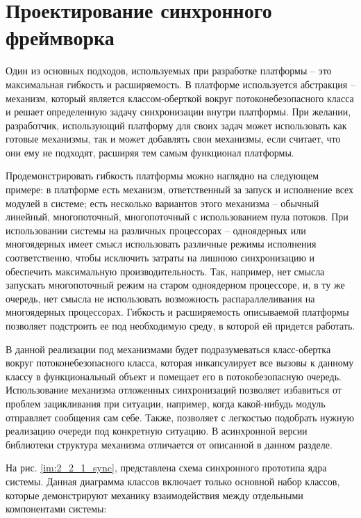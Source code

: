 \section{Проектирование синхронного фреймворка}

Один из основных подходов, используемых при разработке платформы – это 
максимальная гибкость и расширяемость. В платформе используется абстракция – 
механизм, который является классом-оберткой вокруг потоконебезопасного класса и 
решает определенную задачу синхронизации внутри платформы. При желании, 
разработчик, использующий платформу для своих задач  может использовать как 
готовые механизмы, так и может добавлять свои механизмы, если считает, что они 
ему не подходят, расширяя тем самым функционал платформы.

Продемонстрировать гибкость платформы можно наглядно на следующем примере: в 
платформе есть механизм, ответственный за запуск и исполнение всех модулей в 
системе; есть несколько вариантов этого механизма – обычный линейный, 
многопоточный, многопоточный с использованием пула потоков. При использовании 
системы на различных процессорах – одноядерных или многоядерных имеет смысл 
использовать различные режимы исполнения соответственно, чтобы исключить 
затраты на лишнюю синхронизацию и обеспечить максимальную производительность. 
Так, например, нет смысла запускать многопоточный режим на старом одноядерном 
процессоре, и, в ту же очередь, нет смысла не использовать возможность 
распараллеливания на многоядерных процессорах. Гибкость и расширяемость 
описываемой платформы позволяет подстроить ее под необходимую среду, в которой 
ей придется работать.

В данной реализации под механизмами будет подразумеваться класс-обертка вокруг потоконебезопасного класса, которая инкапсулирует все вызовы к данному классу в функциональный объект и помещает его в потокобезопасную очередь. Использование механизма отложенных синхронизаций позволяет избавиться от проблем зацикливания при ситуации, например, когда какой-нибудь модуль отправляет сообщения сам себе. Также, позволяет с легкостью подобрать нужную реализацию очереди под конкретную ситуацию. В асинхронной версии библиотеки структура механизма отличается от описанной в данном разделе.

На рис. \ref{im:2_2_1_sync}, представлена схема синхронного прототипа ядра системы. Данная диаграмма классов включает только основной набор классов, которые демонстрируют механику взаимодействия между отдельными компонентами системы:

